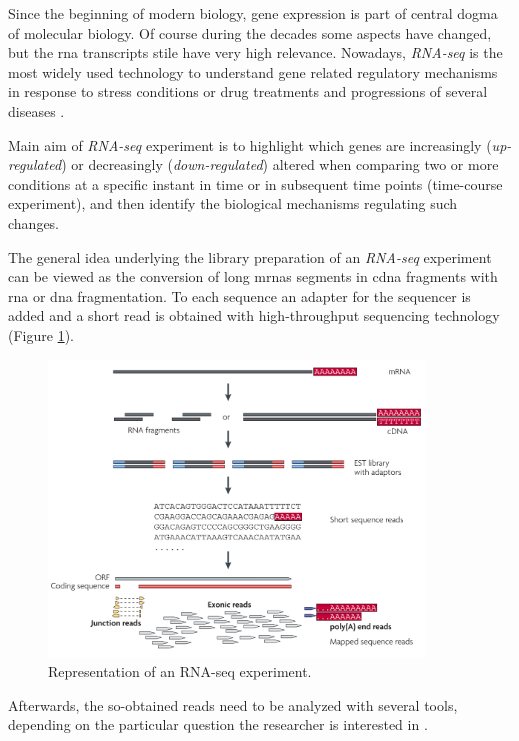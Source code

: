 Since the beginning of modern biology, gene expression is part of central dogma of molecular biology.
Of course during the decades some aspects have changed, but the \gls{rna} transcripts stile have very high relevance.
Nowadays, \textit{RNA-seq} \cite{Thermes2014, Wang2009, Costa2010, Ozsolak2011} is the most widely used technology to understand gene related regulatory mechanisms in response to stress conditions or drug treatments and progressions of several diseases \cite{Costa2013}.

Main aim of \textit{RNA-seq} experiment is to highlight which genes are increasingly (\textit{up-regulated}) or decreasingly (\textit{down-regulated}) altered when comparing two or more conditions at a specific instant in time or in subsequent time points (time-course experiment), and then identify the biological mechanisms regulating such changes.

The general idea underlying the library preparation of an \textit{RNA-seq} experiment can be viewed as the conversion of long \glspl{mrna} segments in \gls{cdna} fragments with \gls{rna} or \gls{dna} fragmentation. 
To each sequence an adapter for the sequencer is added and a short read is obtained with high-throughput sequencing technology (Figure \ref{fig:rnaseqexp}).


\begin{figure}[h]
\centering
\includegraphics[width=10cm, keepaspectratio]{img/intro/rna-seq.png}
\caption[RNA-seq experiment]{Representation of an RNA-seq experiment. \cite{Wang2009}}
\label{fig:rnaseqexp}

\end{figure}

Afterwards, the so-obtained reads need to be analyzed with several tools, depending on the particular question the researcher is interested in \cite{Pepke2009, Oshlack2010}.

